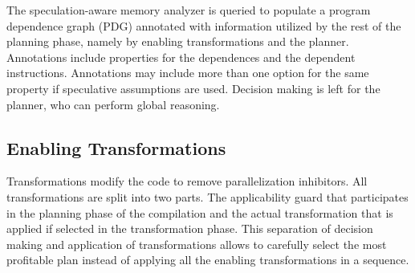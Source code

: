 
The speculation-aware memory analyzer is queried to populate a program
dependence graph (PDG) annotated with information utilized by the rest
of the planning phase, namely by enabling transformations and the
planner. Annotations include properties for the dependences and the
dependent instructions.
Annotations may include more than one option for the same property if
speculative assumptions are used.
%
Decision making is left for the planner, who can perform global
reasoning.


\subsection{Enabling Transformations}
\label{enablers}

Transformations modify the code to remove parallelization inhibitors.
%
All transformations are split into two parts. The applicability guard
that participates in the planning phase of the compilation and the
actual transformation that is applied if selected in the
transformation phase.
This separation of decision making and application of transformations
allows \name to carefully select the most profitable plan instead of
applying all the enabling transformations in a sequence.

